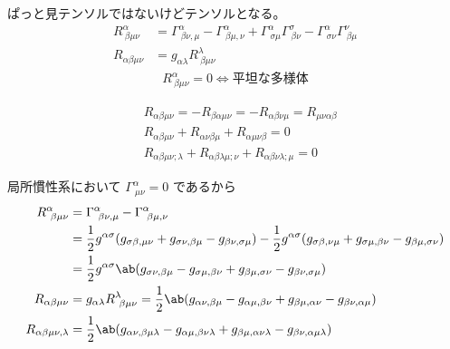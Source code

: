 \documentclass[uplatex,dvipdfmx,a4paper,11pt]{jlreq}
\theoremstyle{definition}
\begin{document}
\begin{definition}[リーマンの曲率テンソル]
  ぱっと見テンソルではないけどテンソルとなる。
  \begin{align}
    R^\alpha_{\ \beta\mu\nu} & = \Gamma^\alpha_{\ \beta\nu,\mu} - \Gamma^\alpha_{\ \beta\mu,\nu} + \Gamma^\alpha_{\ \sigma\mu}\Gamma^\sigma_{\ \beta\nu} - \Gamma^\alpha_{\ \sigma\nu}\Gamma^\nu_{\ \beta\mu} \\
    R_{\alpha\beta\mu\nu}    & = g_{\alpha\lambda}R^\lambda_{\ \beta\mu\nu}
  \end{align}
  \begin{align}
    R^\alpha_{\ \beta\mu\nu} = 0 \iff 平坦な多様体
  \end{align}
\end{definition}
\begin{theorem}
  \begin{align}
     & R_{\alpha\beta\mu\nu} = -R_{\beta\alpha\mu\nu} = -R_{\alpha\beta\nu\mu} = R_{\mu\nu\alpha\beta}   \\
     & R_{\alpha\beta\mu\nu} + R_{\alpha\nu\beta\mu} + R_{\alpha\mu\nu\beta} = 0                         \\
     & R_{\alpha\beta\mu\nu;\lambda} + R_{\alpha\beta\lambda\mu;\nu} + R_{\alpha\beta\nu\lambda;\mu} = 0
  \end{align}
\end{theorem}
局所慣性系において $\Gamma^\alpha_{\ \mu\nu} = 0$ であるから
\begin{align}
  R^\alpha_{\ \beta\mu\nu}      & = \Gamma^\alpha_{\ \beta\nu,\mu} - \Gamma^\alpha_{\ \beta\mu,\nu}                                                                                                                                               \\
                                & = \frac{1}{2}g^{\alpha\sigma}(g_{\sigma\beta,\mu\nu} + g_{\sigma\nu,\beta\mu} - g_{\beta\nu,\sigma\mu}) - \frac{1}{2}g^{\alpha\sigma}(g_{\sigma\beta,\nu\mu} + g_{\sigma\mu,\beta\nu} - g_{\beta\mu,\sigma\nu}) \\
                                & = \frac{1}{2}g^{\alpha\sigma}\ab(g_{\sigma\nu,\beta\mu} - g_{\sigma\mu,\beta\nu} + g_{\beta\mu,\sigma\nu} - g_{\beta\nu,\sigma\mu})                                                                             \\
  R_{\alpha\beta\mu\nu}         & = g_{\alpha\lambda}R^\lambda_{\ \beta\mu\nu} = \frac{1}{2}\ab(g_{\alpha\nu,\beta\mu} - g_{\alpha\mu,\beta\nu} + g_{\beta\mu,\alpha\nu} - g_{\beta\nu,\alpha\mu})                                                \\
  R_{\alpha\beta\mu\nu,\lambda} & = \frac{1}{2}\ab(g_{\alpha\nu,\beta\mu\lambda} - g_{\alpha\mu,\beta\nu\lambda} + g_{\beta\mu,\alpha\nu\lambda} - g_{\beta\nu,\alpha\mu\lambda})
\end{align}
\end{document}
